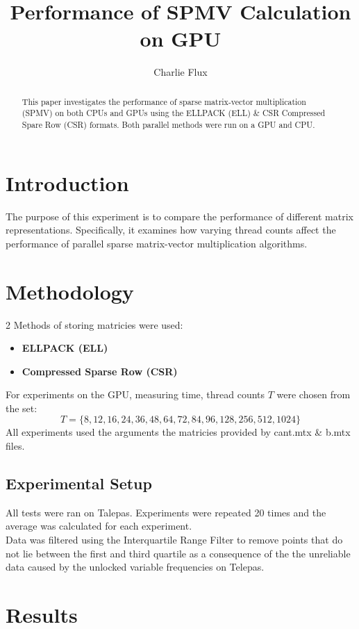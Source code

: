 \documentclass[conference]{IEEEtran}
\title{Performance of SPMV Calculation on GPU}
\author{Charlie Flux}
\begin{document}
\maketitle

\begin{abstract}
This paper investigates the performance of sparse matrix-vector multiplication (SPMV) on both CPUs and GPUs using the ELLPACK (ELL) \& CSR Compressed Spare Row (CSR) formats.
Both parallel methods were run on a GPU and CPU.
\end{abstract}

\section{Introduction}
The purpose of this experiment is to compare the performance of different matrix representations. Specifically, it examines how varying thread counts affect the performance of parallel sparse matrix-vector multiplication algorithms.
\section{Methodology}
2 Methods of storing matricies were used:
\begin{itemize}
    \item \textbf{ELLPACK (ELL)}
    \item \textbf{Compressed Sparse Row (CSR)} 
\end{itemize}

For experiments on the GPU, measuring time, thread counts \(T\) were chosen from the set:
    \[
    T = \{8, 12, 16, 24, 36, 48, 64, 72, 84, 96, 128, 256, 512, 1024\}
    \]
All experiments used the arguments the matricies provided by cant.mtx \& b.mtx files.
\subsection{Experimental Setup}
All tests were ran on Talepas. Experiments were repeated 20 times and the average was calculated for each experiment. \\
Data was filtered using the Interquartile Range Filter to remove points that do not lie between the first and third quartile as a consequence of the the unreliable data caused by the unlocked variable frequencies on Telepas.

\section{Results}
\end{document}

